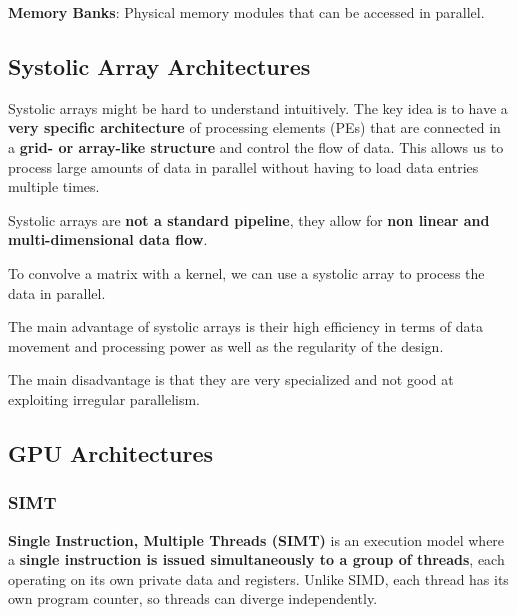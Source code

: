 \begin{definition}
    \textbf{Memory Banks}: Physical memory modules that can be accessed in parallel.
\end{definition}

\subsection{Systolic Array Architectures}

\begin{remark}
    Systolic arrays might be hard to understand intuitively. The key idea is to have a \textbf{very specific architecture} of processing elements (PEs) that are connected in a \textbf{grid- or array-like structure} and control the flow of data. This allows us to process large amounts of data in parallel without having to load data entries multiple times.
\end{remark}

\begin{important}
    Systolic arrays are \textbf{not a standard pipeline}, they allow for \textbf{non linear and multi-dimensional data flow}.
\end{important}

\begin{example}
    To convolve a matrix with a kernel, we can use a systolic array to process the data in parallel. 
\end{example}

\begin{remark}
    The main advantage of systolic arrays is their high efficiency in terms of data movement and processing power as well as the regularity of the design. 
\end{remark}

\begin{remark}
    The main disadvantage is that they are very specialized and not good at exploiting irregular parallelism.
\end{remark}

\subsection{GPU Architectures}

\subsubsection{SIMT}

\begin{definition}
    \textbf{Single Instruction, Multiple Threads (SIMT)} is an execution model where a \textbf{single instruction is issued simultaneously to a group of threads}, each operating on its own private data and registers. Unlike SIMD, each thread has its own program counter, so threads can diverge independently.
\end{definition}

